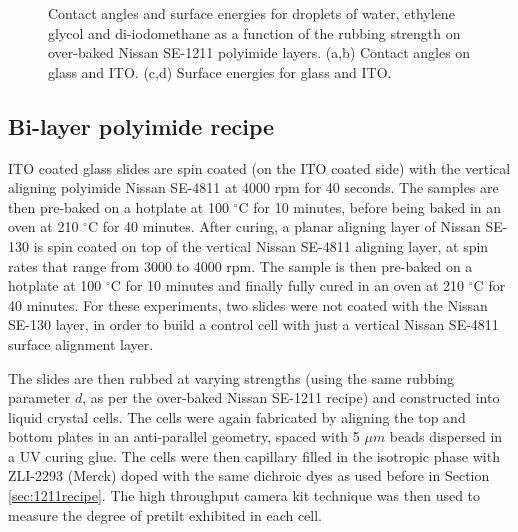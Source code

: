 \begin{figure}
\begin{center}
\end{center}
\caption[Contact angles and surface energies]{\label{fig:contact_angles/energies}Contact angles and surface energies for droplets of water, ethylene glycol and di-iodomethane as a function of the rubbing strength on over-baked Nissan SE-1211 polyimide layers. (a,b) Contact angles on glass and ITO. (c,d) Surface energies for glass and ITO.}
\end{figure}

\subsection{Bi-layer polyimide recipe}
\label{sec:double_layer}

ITO coated glass slides are spin coated (on the ITO coated side) with the vertical aligning polyimide Nissan SE-4811 at 4000 rpm for 40 seconds. The samples are then pre-baked on a hotplate at 100 $^{\circ}$C for 10 minutes, before being baked in an oven at 210 $^{\circ}$C for 40 minutes. After curing, a planar aligning layer of Nissan SE-130 is spin coated on top of the vertical Nissan SE-4811 aligning layer, at spin rates that range from 3000 to 4000 rpm. The sample is then pre-baked on a hotplate at 100 $^{\circ}$C for 10 minutes and finally fully cured in an oven at 210  $^{\circ}$C for 40 minutes. For these experiments, two slides were not coated with the Nissan SE-130 layer, in order to build a control cell with just a vertical Nissan SE-4811 surface alignment layer.

The slides are then rubbed at varying strengths (using the same rubbing parameter $d$, as per the over-baked Nissan SE-1211 recipe) and constructed into liquid crystal cells. The cells were again fabricated by aligning the top and bottom plates in an anti-parallel geometry, spaced with 5 $\mu m$ beads dispersed in a UV curing glue. The cells were then capillary filled in the isotropic phase with ZLI-2293 (Merck) doped with the same dichroic dyes as used before in Section \ref{sec:1211recipe}. The high throughput camera kit technique was then used to measure the degree of pretilt exhibited in each cell.

